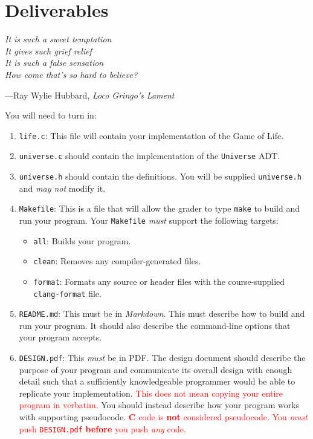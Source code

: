 \documentclass[11pt]{article}
\begin{document}
\section{Deliverables}
\textwidth
\epigraph{\emph{It is such a sweet temptation \\
It gives such grief relief \\
It is such a false sensation \\
How come that's so hard to believe?}}{---Ray Wylie Hubbard, \emph{Loco Gringo's Lament}}

\noindent You will need to turn in:
\begin{enumerate}
  \item \texttt{life.c}: This file will contain your implementation of the Game
    of Life.
  \item \texttt{universe.c} should contain the
    implementation of the \texttt{Universe} ADT.
  \item \texttt{universe.h} should
    contain the definitions. You will be supplied \texttt{universe.h} and
    \emph{may not} modify it.
  \item \texttt{Makefile}: This is a file that will allow the grader to type
    \texttt{make} to build and run your program. Your \texttt{Makefile}
    \emph{must} support the following targets:
    \begin{itemize}
      \item \texttt{all}: Builds your program.
      \item \texttt{clean}: Removes any compiler-generated files.
      \item \texttt{format}: Formats any source or header files with the
        course-supplied \texttt{clang-format} file.
    \end{itemize}
  \item \texttt{README.md}: This must be in \emph{Markdown}. This must describe
    how to build and run your program. It should also describe the command-line
    options that your program accepts.
  \item \texttt{DESIGN.pdf}: This \emph{must} be in PDF\@. The design document
    should describe the purpose of your program and communicate its overall
    design with enough detail such that a sufficiently knowledgeable programmer
    would be able to replicate your implementation.  \textcolor{red}{This does
    not mean copying your entire program in verbatim.} You should instead
    describe how your program works with supporting pseudocode.
    \textcolor{red}{\textbf{C} code is \textbf{not} considered pseudocode. You
    \emph{must} push \texttt{DESIGN.pdf} \textbf{before} you push \emph{any} code.}
\end{enumerate}
\end{document}
